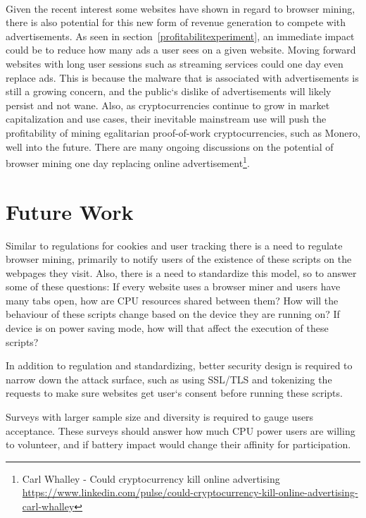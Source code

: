 \\
Given the recent interest some websites have shown in regard to browser mining, there is also potential for this new form of revenue generation to compete with advertisements. As seen in section~\ref{profitabilitexperiment}, an immediate impact could be to reduce how many ads a user sees on a given website. Moving forward websites with long user sessions such as streaming services could one day even replace ads. This is because the malware that is associated with advertisements is still a growing concern, and the public`s dislike of advertisements will likely persist and not wane. Also, as cryptocurrencies continue to grow in market capitalization and use cases, their inevitable mainstream use will push the profitability of mining egalitarian proof-of-work cryptocurrencies, such as Monero, well into the future. There are many ongoing discussions on the potential of browser mining one day replacing online advertisement\footnote{Carl Whalley - Could cryptocurrency kill online advertising \url{https://www.linkedin.com/pulse/could-cryptocurrency-kill-online-advertising-carl-whalley}}.

\section{Future Work}
Similar to regulations for cookies and user tracking there is a need to regulate browser mining, primarily to notify users of the existence of these scripts on the webpages they visit. Also, there is a need to standardize this model, so to answer some of these questions: If every website uses a browser miner and users have many tabs open, how are CPU resources shared between them? How will the behaviour of these scripts change based on the device they are running on? If device is on power saving mode, how will that affect the execution of these scripts?

In addition to regulation and standardizing, better security design is required to narrow down the attack surface, such as using SSL/TLS and tokenizing the requests to make sure websites get user`s consent before running these scripts. 

Surveys with larger sample size and diversity is required to gauge users acceptance. These surveys should answer how much CPU power users are willing to volunteer, and if battery impact would change their affinity for participation.

